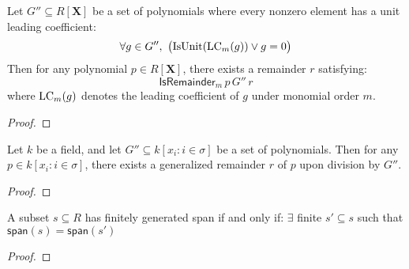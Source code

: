         \begin{lemma}\label{div_set’}
          \leanok
          Let $G'' \subseteq R[\mathbf{X}]$ be a set of polynomials where every nonzero element has a unit leading coefficient:
\[
  \forall g \in G'',\ \big(\mathrm{IsUnit}(\LC_m(g)) \lor g = 0\big)
\]
Then for any polynomial $p \in R[\mathbf{X}]$, there exists a remainder $r$ satisfying:
\[
  \mathsf{IsRemainder}_m\,p\,G''\,r
\]
where $\operatorname{LC}_m(g)$ denotes the leading coefficient of $g$ under monomial order $m$.

        \end{lemma}
        
        \begin{proof}
          \leanok
        \end{proof}
        

        \begin{lemma}\label{div_set’’}
          \leanok
          Let \( k \) be a field, and let \( G'' \subseteq k[x_i : i \in \sigma] \) be a set of polynomials.
Then for any \( p \in k[x_i : i \in \sigma] \), there exists a generalized remainder \( r \) of \( p \) upon division by \( G'' \).

        \end{lemma}
        
        \begin{proof}
          \leanok
        \end{proof}
        

        \begin{lemma}\label{fg_span_iff_fg_span_finset_subset}
          
          \leanok
          A subset $s \subseteq R$ has finitely generated span if and only if:
$\exists$ finite $s' \subseteq s$ such that $\mathsf{span}(s) = \mathsf{span}(s')$

        \end{lemma}
        
        \begin{proof}
          
          
        \end{proof}
        

